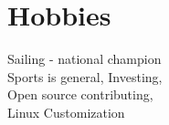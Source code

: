 \documentclass[letterpaper]{deedy-resume} %
\begin{document}
\begin{minipage}[t]{0.66\textwidth}

%
%


\section{Hobbies} 

Sailing - national champion \\ 
Sports is general, Investing, \\
Open source contributing, \\
Linux Customization \\

\sectionspace %


\end{minipage} %








\end{document}
